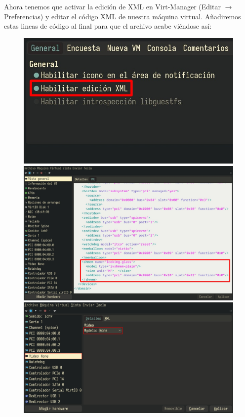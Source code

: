 \documentclass[11pt]{article}
\begin{document}
Ahora tenemos que activar la edición de XML en Virt-Manager (Editar $\to$ Preferencias) y editar el código XML de nuestra máquina virtual. Añadiremos estas lineas de código al final para que el archivo acabe viéndose así:

\begin{figure}[h!]
	\centering
	\begin{minipage}[b]{0.3285\textwidth}
		\includegraphics[height=0.6\textwidth,width=\textwidth]{images/xml-enable.jpg}
	\end{minipage}
	\begin{minipage}[b]{0.3285\textwidth}
		\includegraphics[height=0.6\textwidth,width=\textwidth]{images/xml-edit.jpg}
	\end{minipage}
	\begin{minipage}[b]{0.3285\textwidth}
		\includegraphics[height=0.6\textwidth,width=\textwidth]{images/video-none.jpg}
	\end{minipage}
\end{figure}
\end{document}
